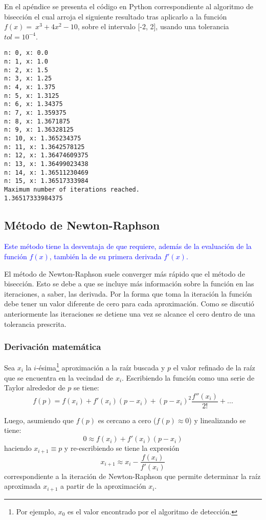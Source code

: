 En el apéndice se presenta el código en Python correspondiente al algoritmo de 
bisección el cual arroja el siguiente resultado tras aplicarlo a la función $f 
(x) = \ x^3 + 4x^2 - 10$, sobre el intervalo [-2, 2], usando una tolerancia 
$tol = 10^{-4}$.

\begin{verbatim}
n: 0, x: 0.0
n: 1, x: 1.0
n: 2, x: 1.5
n: 3, x: 1.25
n: 4, x: 1.375
n: 5, x: 1.3125
n: 6, x: 1.34375
n: 7, x: 1.359375
n: 8, x: 1.3671875
n: 9, x: 1.36328125
n: 10, x: 1.365234375
n: 11, x: 1.3642578125
n: 12, x: 1.36474609375
n: 13, x: 1.36499023438
n: 14, x: 1.36511230469
n: 15, x: 1.36517333984
Maximum number of iterations reached.
1.36517333984375
\end{verbatim}

\subsection{Método de Newton-Raphson}

\textcolor{blue}{Este método tiene la desventaja de que requiere, además de la 
evaluación de la función $f(x)$, también la de su primera derivada $f'(x)$.}

El método de Newton-Raphson suele converger más rápido que el método de 
bisección. Esto se debe a que se incluye más información sobre la función en 
las iteraciones, a saber, las derivada. Por la forma que toma la iteración la 
función debe tener un valor diferente de cero para cada aproximación. Como se 
discutió anteriormente las iteraciones se detiene una vez se alcance el cero 
dentro de una tolerancia prescrita.

\subsubsection*{Derivación matemática}
Sea $x_i$ la $i$-ésima\footnote{Por ejemplo, $x_0$ es el valor 
encontrado por el algoritmo de detección.} aproximación a la raíz buscada y $p$ 
el valor refinado de la raíz que se encuentra en la vecindad de 
$x_i$. Escribiendo la función como una serie de Taylor alrededor de $p$ se 
tiene:
\[f(p)=f(x_i)+f'(x_i)(p-x_i)+{(p-x_i)}^2\frac{f''(x_i)}{2!}+...\]

Luego, asumiendo que $f(p)$ es cercano a cero ($f(p)\approx0$) y linealizando 
se tiene:
\[ 0\approx f(x_i)+f'(x_i)(p-x_i) \]
haciendo $x_{i+1}\equiv p$ y re-escribiendo se tiene la expresión
\[x_{i+1}\approx x_i-\frac{f(x_i)}{f'(x_i)}\]
correspondiente a la iteración de Newton-Raphson que permite determinar la raíz 
aproximada  $x_{i+1}$ a partir de la aproximación $x_i$.

